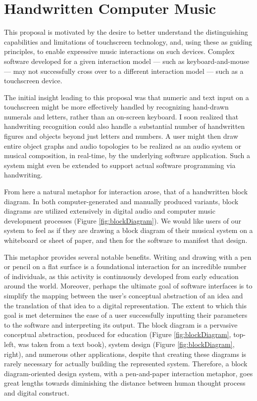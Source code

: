 \documentclass[10pt,letterpaper]{article}
\begin{document}
\section{Handwritten Computer Music}
\label{sec:HandwrittenComputerMusic}

This proposal is motivated by the desire to better understand the distinguishing capabilities and limitations of touchscreen technology, and, using these as guiding principles, to enable expressive music interactions on such devices. 
Complex software developed for a given interaction model --- such as keyboard-and-mouse --- may not successfully cross over to a different interaction model --- such as a touchscreen device. 

The initial insight leading to this proposal was that numeric and text input on a touchscreen might be more effectively handled by recognizing hand-drawn numerals and letters, rather than an on-screen keyboard. 
I soon realized that handwriting recognition could also handle a substantial number of handwritten figures and objects beyond just letters and numbers. 
A user might then draw entire object graphs and audio topologies to be realized as an audio system or musical composition, in real-time, by the underlying software application. 
Such a system might even be extended to support actual software programming via handwriting. 

From here a natural metaphor for interaction arose, that of a handwritten block diagram.
In both computer-generated and manually produced variants, block diagrams are utilized extensively in digital audio and computer music development processes (Figure \ref{fig:blockDiagram}). 
We would like users of our system to feel as if they are drawing a block diagram of their musical system on a whiteboard or sheet of paper, and then for the software to manifest that design. 

This metaphor provides several notable benefits. 
Writing and drawing with a pen or pencil on a flat surface is a foundational interaction for an incredible number of individuals, as this activity is continuously developed from early education around the world. 
Moreover,  perhaps the ultimate goal of software interfaces is to simplify the mapping between the user's conceptual abstraction of an idea and the translation of that idea to a digital representation. 
The extent to which this goal is met determines the ease of a user successfully inputting their parameters to the software and interpreting its output. 
The block diagram is a pervasive conceptual abstraction, produced for education (Figure \ref{fig:blockDiagram}, top-left, was taken from a text book), system design (Figure \ref{fig:blockDiagram}, right), and numerous other applications, despite that creating these diagrams is rarely necessary for actually building the represented system. 
Therefore, a block diagram-oriented design system, with a pen-and-paper interaction metaphor, goes great lengths towards diminishing the distance between human thought process and digital construct. 
\end{document}
